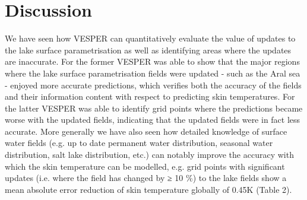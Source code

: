 \documentclass[hess, twostagejnl]{copernicus}
\begin{document}
\section{Discussion}
We have seen how VESPER can quantitatively evaluate the value of updates to the lake surface parametrisation as well as identifying areas where the updates are inaccurate. For the former VESPER was able to show that the major regions where the lake surface parametrisation fields were updated - such as the Aral sea - enjoyed more accurate predictions, which verifies both the accuracy of the fields and their information content with respect to predicting skin temperatures. For the latter VESPER was able to identify grid points where the predictions became worse with the updated fields, indicating that the updated fields were in fact less accurate. More generally we have also seen how detailed knowledge of surface water fields (e.g. up to date permanent water distribution, seasonal water distribution, salt lake distribution, etc.) can notably improve the accuracy with which the skin temperature can be modelled, e.g. grid points with significant updates (i.e. where the field has changed by ≥ 10 \%) to the lake fields show a mean absolute error reduction of skin temperature globally of 0.45K (Table 2). \newline 
\end{document}
